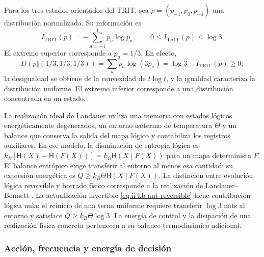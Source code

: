 Para los tres estados orientados del TRIT, sea
\(p=(p_{-1},p_0,p_{+1})\) una distribución normalizada. Su información es
\begin{equation}
 I_{\mathrm{TRIT}}(p)=-\sum_{a=-1}^{1}p_a\log p_a,
 \qquad 0\leq I_{\mathrm{TRIT}}(p)\leq\log3.
 \label{eq:ii-kb-aut-trit}
\end{equation}
El extremo superior corresponde a \(p_a=1/3\). En efecto,
\[
 D(p\Vert(1/3,1/3,1/3))
 =\sum_ap_a\log(3p_a)=\log3-I_{\mathrm{TRIT}}(p)\geq0;
\]
la desigualdad se obtiene de la convexidad de \(t\log t\), y la
igualdad caracteriza la distribución uniforme. El extremo inferior
corresponde a una distribución concentrada en un estado.

La realización ideal de Landauer utiliza una memoria con estados lógicos
energéticamente degenerados, un entorno isotermo de temperatura \(\Theta\)
y un balance que conserva la salida del mapa lógico y contabiliza los
registros auxiliares. En ese modelo, la disminución de entropía lógica es
\(k_B[\mathsf H(X)-\mathsf H(F(X))]
=k_B\mathsf H(X\mid F(X))\) para un mapa determinista \(F\).
El balance entrópico exige transferir al entorno al menos esa cantidad;
su expresión energética es \(Q\geq k_B\Theta\mathsf H(X\mid F(X))\).
La distinción entre evolución lógica reversible y borrado físico
corresponde a la realización de Landauer--Bennett \cite{bennett2003}.
La actualización invertible
\eqref{eq:ii-kb-aut-reversible} tiene contribución lógica nula; el
reinicio de una terna uniforme requiere transferir \(\log3\) nats
al entorno y satisface \(Q\geq k_B\Theta\log3\).
La energía de control y la disipación de una realización física
concreta pertenecen a su balance termodinámico adicional.

\subsubsection{Acción, frecuencia y energía de decisión}

